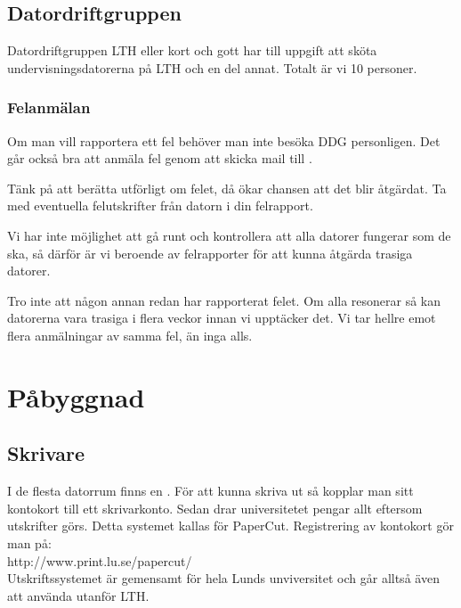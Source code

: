 \documentclass[a4paper,twocolumn]{book}
\begin{document}
\section{Datordriftgruppen}

Datordriftgruppen LTH eller kort och gott
 har till uppgift att sköta undervisningsdatorerna på
LTH och en del annat. Totalt är vi 10 personer.

\subsection{Felanmälan}
Om man vill rapportera ett fel behöver man inte besöka DDG
personligen. Det går också bra att anmäla fel genom att skicka mail till
.

Tänk på att berätta utförligt om felet, då ökar chansen att det blir
åtgärdat. Ta med eventuella felutskrifter från datorn i din
felrapport.

Vi har inte möjlighet att gå runt och kontrollera att alla datorer
fungerar som de ska, så därför är vi beroende av felrapporter för att
kunna åtgärda trasiga datorer.

Tro inte att någon annan redan har rapporterat felet. Om alla
resonerar så kan datorerna vara trasiga i flera veckor innan vi
upptäcker det. Vi tar hellre emot flera anmälningar av samma fel, än
inga alls.


\chapter{Påbyggnad}
\label{cha:pabyggnad}

\section{Skrivare}

\label{sec:skrivare}
I de flesta datorrum finns en .
För att kunna skriva ut så kopplar man sitt kontokort till ett skrivarkonto.
Sedan drar universitetet pengar allt eftersom utskrifter görs. Detta systemet kallas för PaperCut. Registrering av kontokort gör man på: \\
http://www.print.lu.se/papercut/ \\
Utskriftssystemet är gemensamt för hela Lunds
unviversitet och går alltså även att använda utanför LTH.
\end{document}
